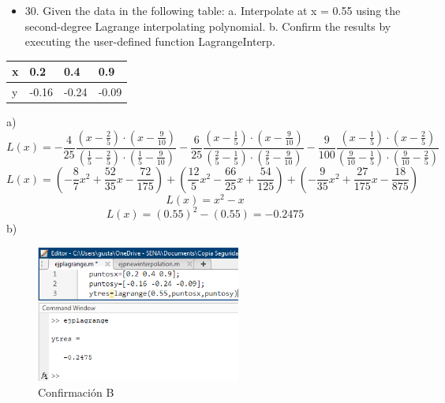 \documentclass{article}
\begin{document}
\setlength{\tabcolsep}{1.05625pt}
\renewcommand{\arraystretch}{1.6}
\begin{itemize}
    \item 30. Given the data in the following table:
          \newline
          a. Interpolate at x = 0.55 using the second-degree Lagrange
          interpolating polynomial.
          \newline
          b. Confirm the results by executing the user-defined function
          LagrangeInterp.
\end{itemize}
\begin{table}[h!]
    \begin{tabular}{|l|l|l|l|}
        \hline
        \multicolumn{1}{|p{30.865313pt}}{\raggedright x} & \multicolumn{1}{|p{30.865313pt}}{\raggedright 0.2}   & \multicolumn{1}{|p{30.865313pt}}{\raggedright 0.4}   & \multicolumn{1}{|p{30.1125pt}|}{\raggedright 0.9}   \\ \hline
        \multicolumn{1}{|p{30.865313pt}}{\raggedright y} & \multicolumn{1}{|p{30.865313pt}}{\raggedright -0.16} & \multicolumn{1}{|p{30.865313pt}}{\raggedright -0.24} & \multicolumn{1}{|p{30.1125pt}|}{\raggedright -0.09} \\ \hline
    \end{tabular}
\end{table}
a)
\begin{equation*}
    L(x) = -\frac{4}{25}\frac{(x-\frac{2}{5}) \cdot (x-\frac{9}{10})}{(\frac{1}{5}-\frac{2}{5}) \cdot (\frac{1}{5}-\frac{9}{10})}-\frac{6}{25}\frac{(x-\frac{1}{5}) \cdot (x-\frac{9}{10})}{(\frac{2}{5}-\frac{1}{5}) \cdot (\frac{2}{5}-\frac{9}{10})}-\frac{9}{100}\frac{(x-\frac{1}{5}) \cdot (x-\frac{2}{5})}{(\frac{9}{10}-\frac{1}{5}) \cdot (\frac{9}{10}-\frac{2}{5})}
\end{equation*} 
\begin{equation*}
    L(x) = (-\frac{8}{7}x^2+\frac{52}{35}x-\frac{72}{175})+(\frac{12}{5}x^2-\frac{66}{25}x+\frac{54}{125})+(-\frac{9}{35}x^2+\frac{27}{175}x-\frac{18}{875})
\end{equation*}
\begin{equation*}
    L(x) = x^2-x
\end{equation*}
\begin{equation*}
    L(x) = (0.55)^2-(0.55) = \boxed{-0.2475}
\end{equation*}
b)
\begin{figure}[H]
    \centering
    \includegraphics[width=0.6\textwidth]{30a.png}
    \caption{Confirmación B}
    \label{fig:imagen1}
    \end{figure}
\end{document}
